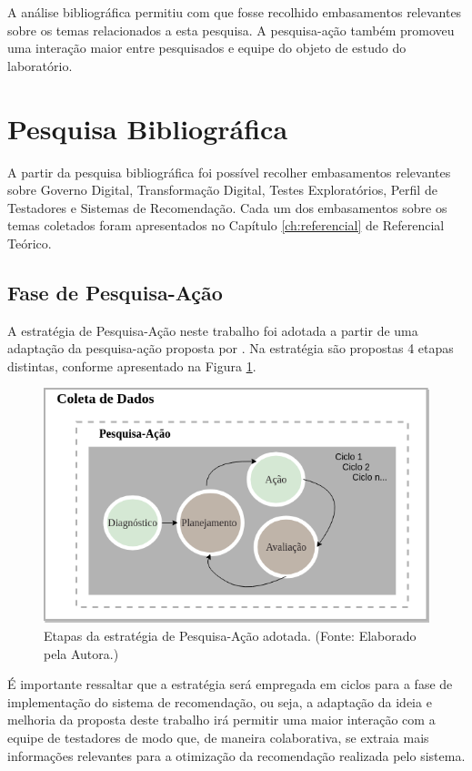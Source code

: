 A análise bibliográfica permitiu com que fosse recolhido embasamentos relevantes sobre os temas relacionados a esta pesquisa. A pesquisa-ação também promoveu uma interação maior entre pesquisados e equipe do objeto de estudo do laboratório.

\section{Pesquisa Bibliográfica}

A partir da pesquisa bibliográfica foi possível recolher embasamentos relevantes sobre Governo Digital, Transformação Digital, Testes Exploratórios, Perfil de Testadores e Sistemas de Recomendação. Cada um dos embasamentos sobre os temas coletados foram apresentados no Capítulo \ref{ch:referencial} de Referencial Teórico.

\subsection{Fase de Pesquisa-Ação}

A estratégia de Pesquisa-Ação neste trabalho foi adotada a partir de uma adaptação da pesquisa-ação proposta por \cite{petersen2008systematic}. Na estratégia são propostas 4 etapas distintas, conforme apresentado na Figura \ref{fig:etapasPesquisaAcao}.

        \begin{figure}[H]
          \centering
          \includegraphics[width=12cm]{figuras/etapasPesquisaAcao.png}
          \caption{Etapas da estratégia de Pesquisa-Ação adotada. (Fonte: Elaborado pela Autora.)}
          \label{fig:etapasPesquisaAcao}

        \end{figure}

É importante ressaltar que a estratégia será empregada em ciclos para a fase de implementação do sistema de recomendação, ou seja, a adaptação da ideia e melhoria da proposta deste trabalho irá permitir uma maior interação com a equipe de testadores de modo que, de maneira colaborativa, se extraia mais informações relevantes para a otimização da recomendação realizada pelo sistema.

